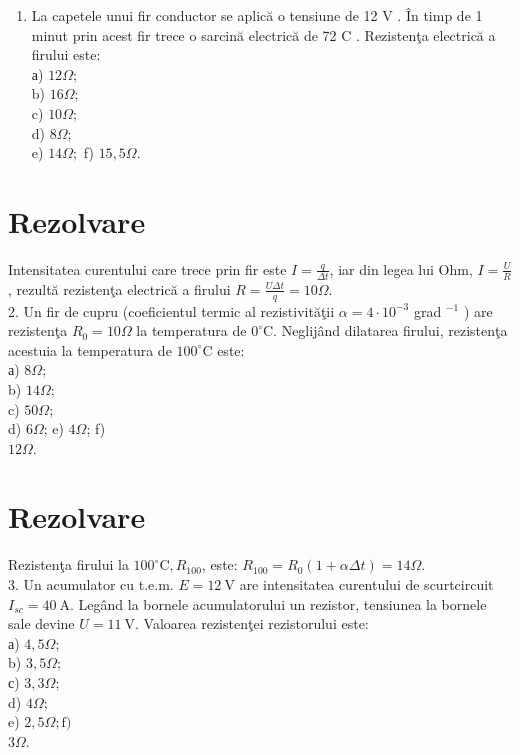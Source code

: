 
\begin{enumerate}
  \item La capetele unui fir conductor se aplică o tensiune de 12 V . În timp de 1 minut prin acest fir trece o sarcină electrică de 72 C . Rezistenţa electrică a firului este:\\
а) $12 \Omega$;\\
b) $16 \Omega$;\\
c) $10 \Omega$;\\
d) $8 \Omega$;\\
e) $14 \Omega ;$ f) $15,5 \Omega$.
\end{enumerate}

\section*{Rezolvare}
Intensitatea curentului care trece prin fir este $I=\frac{q}{\Delta t}$, iar din legea lui Ohm, $I=\frac{U}{R}$, rezultă rezistenţa electrică a firului $R=\frac{U \Delta t}{q}=10 \Omega$.\\
2. Un fir de cupru (coeficientul termic al rezistivităţii $\alpha=4 \cdot 10^{-3}$ grad $^{-1}$ ) are rezistenţa $R_{0}=10 \Omega$ la temperatura de $0^{\circ} \mathrm{C}$. Neglijând dilatarea firului, rezistenţa acestuia la temperatura de $100^{\circ} \mathrm{C}$ este:\\
а) $8 \Omega$;\\
b) $14 \Omega$;\\
c) $50 \Omega$;\\
d) $6 \Omega$; e) $4 \Omega$; f)\\
$12 \Omega$.

\section*{Rezolvare}
Rezistenţa firului la $100^{\circ} \mathrm{C}, R_{100}$, este: $R_{100}=R_{0}(1+\alpha \Delta t)=14 \Omega$.\\
3. Un acumulator cu t.e.m. $E=12 \mathrm{~V}$ are intensitatea curentului de scurtcircuit $I_{s c}=40 \mathrm{~A}$. Legând la bornele acumulatorului un rezistor, tensiunea la bornele sale devine $U=11 \mathrm{~V}$. Valoarea rezistenţei rezistorului este:\\
а) $4,5 \Omega$;\\
b) $3,5 \Omega$;\\
с) $3,3 \Omega$;\\
d) $4 \Omega$;\\
e) $2,5 \Omega ; \mathrm{f})$\\
$3 \Omega$.

